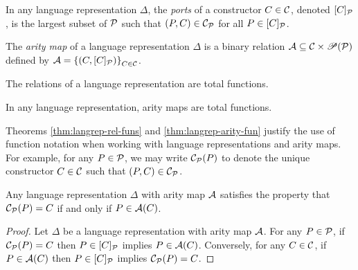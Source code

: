 \begin{definition}
  In any language representation $\Delta$,
  the \emph{ports} of a constructor $C \in \mathcal{C}$, denoted $[C]_{\mathcal{P}}$,
  is the largest subset of $\mathcal{P}$ such that $(P, C) \in \mathcal{C}_{\mathcal{P}}$ for all $P \in [C]_{\mathcal{P}}$.
\end{definition}

\begin{definition}
  The \emph{arity map} of a language representation $\Delta$
  is a binary relation $\mathcal{A} \subseteq \mathcal{C} \times \mathscr{P}\mathopen{}\left(\mathcal{P}\right)\mathclose{}$
  defined by $\mathcal{A} = \left\{(C, [C]_{\mathcal{P}})\right\}_{C \in \mathcal{C}}$.
\end{definition}

\begin{theorem}
  \label{thm:langrep-rel-funs}
  The relations of a language representation are total functions.
\end{theorem}

\begin{theorem}
  \label{thm:langrep-arity-fun}
  In any language representation, arity maps are total functions.
\end{theorem}

Theorems \ref{thm:langrep-rel-funs} and \ref{thm:langrep-arity-fun}
justify the use of function notation when working with language representations and arity maps.
For example, for any $P \in \mathcal{P}$, we may write $\mathcal{C}_{\mathcal{P}}(P)$
to denote the unique constructor $C \in \mathcal{C}$ such that $(P, C) \in \mathcal{C}_{\mathcal{P}}$.

\begin{theorem}
  Any language representation $\Delta$ with arity map $\mathcal{A}$
  satisfies the property that $\mathcal{C}_{\mathcal{P}}(P) = C$ if and only if $P \in \mathcal{A}(C)$.
\end{theorem}

\begin{proof}
  Let $\Delta$ be a language representation with arity map $\mathcal{A}$.
  For any $P \in \mathcal{P}$, if $\mathcal{C}_{\mathcal{P}}(P) = C$ then $P \in [C]_{\mathcal{P}}$ implies $P \in \mathcal{A}(C)$.
  Conversely, for any $C \in \mathcal{C}$, if $P \in \mathcal{A}(C)$ then $P \in [C]_{\mathcal{P}}$ implies $\mathcal{C}_{\mathcal{P}}(P) = C$.
\end{proof}
